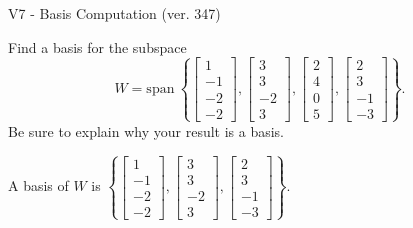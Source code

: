 \begin{exercise}
  \begin{exerciseTitle}V7 - Basis Computation (ver. 347)\end{exerciseTitle}
  \begin{exerciseStatement}
    Find a basis for the subspace 
\[W=\mathrm{span}\ \left\{\left[\begin{array}{r}
1 \\
-1 \\
-2 \\
-2
\end{array}\right] , \left[\begin{array}{r}
3 \\
3 \\
-2 \\
3
\end{array}\right] , \left[\begin{array}{r}
2 \\
4 \\
0 \\
5
\end{array}\right] , \left[\begin{array}{r}
2 \\
3 \\
-1 \\
-3
\end{array}\right]\right\}.\]
 Be sure to explain why your result is a basis.


  \end{exerciseStatement}
  \begin{exerciseAnswer}
   A basis of \(W\) is  \(\left\{\left[\begin{array}{r}
1 \\
-1 \\
-2 \\
-2
\end{array}\right] , \left[\begin{array}{r}
3 \\
3 \\
-2 \\
3
\end{array}\right] , \left[\begin{array}{r}
2 \\
3 \\
-1 \\
-3
\end{array}\right]\right\}\).
  


  \end{exerciseAnswer}
\end{exercise}